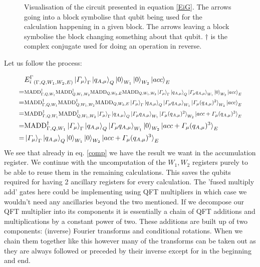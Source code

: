 \begin{figure}[H]
    \caption{Visualisation of the circuit presented in equation \ref{EiG}. The arrows going into a block symbolise that qubit being used for the calculation happening in a given block. The arrows leaving a block symbolise the block changing something about that qubit. $\dagger$ is the complex conjugate used for doing an operation in reverse.}
\end{figure}
Let us follow the process:

\begin{align}
    &{E_i^\Gamma}_{(\Gamma,Q,W_1,W_2,E)}\ket{\varGamma_\mu}_\Gamma\ket{q_{A,\mu}}_Q\ket{0}_{W_1}\ket{0}_{W_2}\ket{acc}_E\\
    =&\resizebox{.9\hsize}{!}{$\text{MADD}^\dagger_{\Gamma,Q,W_1}\text{MADD}^\dagger_{Q,W_1,W_2}\text{MADD}_{Q,W_2,E}\text{MADD}_{Q,W_1,W_2}\ket{\varGamma_\mu}_\Gamma\ket{q_{A,\mu}}_Q\ket{\varGamma_\mu q_{A,\mu}}_{W_1}\ket{0}_{W_2}\ket{acc}_E$}\\
    =&\resizebox{.9\hsize}{!}{$\text{MADD}^\dagger_{\Gamma,Q,W_1}\text{MADD}^\dagger_{Q,W_1,W_2}\text{MADD}_{Q,W_2,E}\ket{\varGamma_\mu}_\Gamma\ket{q_{A,\mu}}_Q\ket{\varGamma_\mu q_{A,\mu}}_{W_1}\ket{\varGamma_\mu (q_{A,\mu})^2}_{W_2}\ket{acc}_E$}\\
    =&\resizebox{.9\hsize}{!}{$\text{MADD}^\dagger_{\Gamma,Q,W_1}\text{MADD}^\dagger_{Q,W_1,W_2}\ket{\varGamma_\mu}_\Gamma\ket{q_{A,\mu}}_Q\ket{\varGamma_\mu q_{A,\mu}}_{W_1}\ket{\varGamma_\mu (q_{A,\mu})^2}_{W_2}\ket{acc+\varGamma_\mu (q_{A,\mu})^3}_E\label{comp}$}\\
    =&\text{MADD}^\dagger_{\Gamma,Q,W_1}\ket{\varGamma_\mu}_\Gamma\ket{q_{A,\mu}}_Q\ket{\varGamma_\mu q_{A,\mu}}_{W_1}\ket{0}_{W_2}\ket{acc+\varGamma_\mu (q_{A,\mu})^3}_E\\
    =&\ket{\varGamma_\mu}_\Gamma\ket{q_{A,\mu}}_Q\ket{0}_{W_1}\ket{0}_{W_2}\ket{acc+\varGamma_\mu (q_{A,\mu})^3}_E\\
\end{align}
We see that already in eq. \ref{comp} we have the result we want in the accumulation register. We continue with the uncomputation of the $W_1,W_2$ registers purely to be able to reuse them in the remaining calculations. This saves the qubits required for having 2 ancillary registers for every calculation. The 'fused multiply add' gates here could be implementing using QFT multipliers\cite{perez2017} in which case we wouldn't need any ancillaries beyond the two mentioned. If we decompose our QFT multiplier into its components it is essentially a chain of QFT additions\cite{draper2000,perez2017} and multiplications by a constant power of two. These additions are built up of two components: (inverse) Fourier transforms and conditional rotations. When we chain them together like this however many of the transforms can be taken out as they are always followed or preceded by their inverse except for in the beginning and end. 
